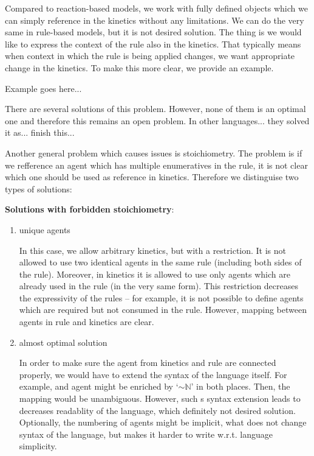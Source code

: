 \documentclass[12pt]{fithesis2}
\begin{document}
Compared to reaction-based models, we work with fully defined objects which we can simply reference in the kinetics without any limitations. We can do the very same in rule-based models, but it is not desired solution. The thing is we would like to express the context of the rule also in the kinetics. That typically means when context in which the rule is being applied changes, we want appropriate change in the kinetics. To make this more clear, we provide an example.

Example goes here...

There are several solutions of this problem. However, none of them is an optimal one and therefore this remains an open problem. In other languages... they solved it as... finish this...

Another general problem which causes issues is stoichiometry. The problem is if we refference an agent which has multiple enumeratives in the rule, it is not clear which one should be used as reference in kinetics. Therefore we distinguise two types of solutions:

\textbf{Solutions with forbidden stoichiometry}:

\begin{enumerate}
\item unique agents

In this case, we allow arbitrary kinetics, but with a restriction. It is not allowed to use two identical agents in the same rule (including both sides of the rule). Moreover, in kinetics it is allowed to use only agents which are already used in the rule (in the very same form). This restriction decreases the expressivity of the rules -- for example, it is not possible to define agents which are required but not consumed in the rule. However, mapping between agents in rule and kinetics are clear.

\item almost optimal solution

In order to make sure the agent from kinetics and rule are connected properly, we would have to extend the syntax of the language itself. For example, and agent might be enriched by `$\sim\mathbb{N}$' in both places. Then, the mapping would be unambiguous. However, such s syntax extension leads to decreases readablity of the language, which definitely not desired solution. Optionally, the numbering of agents might be implicit, what does not change syntax of the language, but makes it harder to write w.r.t. language simplicity.

\end{enumerate}
\end{document}
